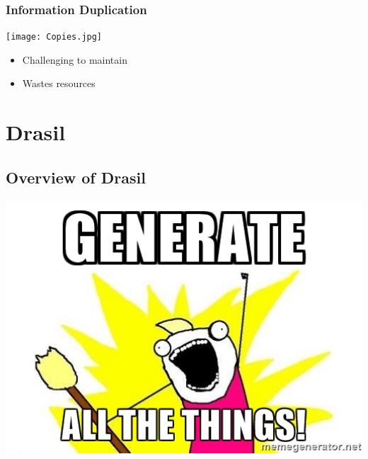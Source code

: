 \documentclass{beamer}
\begin{document}

\begin{frame}

\frametitle{Information Duplication}
\begin{center}
\texttt{[image: Copies.jpg]}
\end{center}
\begin{itemize}
\item Challenging to maintain
\item Wastes resources
\end{itemize}

\end{frame}


\section[Drasil]{Drasil}


\subsection[Overview]{Overview of Drasil}


\begin{frame}
\includegraphics[width=1\textwidth]{../WG2_11/generate_all_the_things.jpg}
\end{frame}
\end{document}
